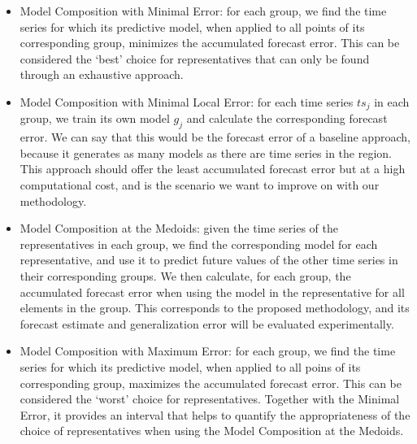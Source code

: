 \begin{itemize}%
	\item Model Composition with Minimal Error: for each group, we find the time series for which its predictive model, when applied to all points of its corresponding group, minimizes the accumulated forecast error. This can be considered the `best' choice for representatives that can only be found through an exhaustive approach.
	\item Model Composition with Minimal Local Error: for each time series $ts_j$ in each group, we train its own model $g_j$ and calculate the corresponding forecast error. We can say that this would be the forecast error of a baseline approach, because it generates as many models as there are time series in the region. This approach should offer the least accumulated forecast error but at a high computational cost, and is the scenario we want to improve on with our methodology.
	\item Model Composition at the Medoids: given the time series of the representatives in each group, we find the corresponding model for each representative, and use it to predict future values of the other time series in their corresponding groups. We then calculate, for each group, the accumulated forecast error when using the model in the representative for all elements in the group. This corresponds to the proposed methodology, and its forecast estimate and generalization error will be evaluated experimentally.
	\item Model Composition with Maximum Error: for each group, we find the time series for which its predictive model, when applied to all poins of its corresponding group, maximizes the accumulated forecast error. This can be considered the `worst' choice for representatives. Together with the Minimal Error, it provides an interval that helps to quantify the appropriateness of the choice of representatives when using the Model Composition at the Medoids.
\end{itemize}



